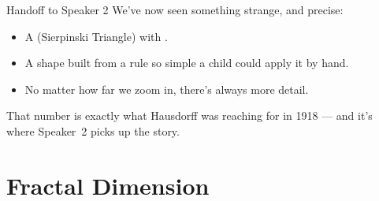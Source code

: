 \begin{frame}{Handoff to Speaker 2}
  \small
  We've now seen something strange, and precise:

  \begin{itemize}
    \item A  (Sierpinski Triangle) with
      .
    \item A shape built from a rule so simple a child could apply it
      by hand.
    \item No matter how far we zoom in, there's always more detail.
  \end{itemize}

  \pause
  \vspace{0.3cm}
  \begin{center}
  \end{center}

  \vspace{0.2cm}
  \pause
  That number is exactly what Hausdorff was reaching for in 1918 ---
  and it's where Speaker~2 picks up the story.
\end{frame}

\section{Fractal Dimension}


